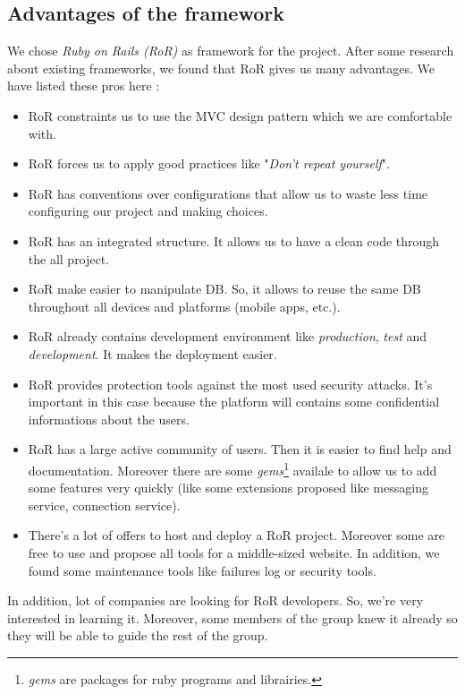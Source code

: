 \label{ror}
\subsection{Advantages of the framework}

We chose \emph{Ruby on Rails (RoR)} as framework for the project. After some research about existing frameworks, we found that RoR gives us many advantages. We have listed these pros here :

\begin{itemize}
   \item RoR constraints us to use the MVC design pattern which we are comfortable with.
   \item RoR forces us to apply good practices like "\emph{Don't repeat yourself}".
   \item RoR has conventions over configurations that allow us to waste less time configuring our project and making choices.
   \item RoR has an integrated structure. It allows us to have a clean code through the all project.
   \item RoR make easier to manipulate DB. So, it allows to reuse the same DB throughout all devices and platforms (mobile apps, etc.).
   \item RoR already contains development environment like \emph{production}, \emph{test} and \emph{development}. It makes the deployment easier.
   \item RoR provides protection tools against the most used security attacks. It's important in this case because the platform will contains some confidential informations about the users.
   \item RoR has a large active community of users. Then it is easier to find help and documentation. Moreover there
   are some \emph{gems}\footnote{\emph{gems} are packages for ruby programs and
   librairies.} availale to allow us to add some features very quickly 
   (like some extensions proposed like messaging service, connection service). 
   \item There's a lot of offers to host and deploy a RoR project. Moreover some are free to use and 
   propose all tools for a middle-sized website.  In addition, we found some maintenance tools like failures log or security tools.
\end{itemize}

In addition, lot of companies are looking for RoR developers. So, we're very interested in learning it. Moreover, 
some members of the group knew it already so they will be able to guide the rest of the group.

